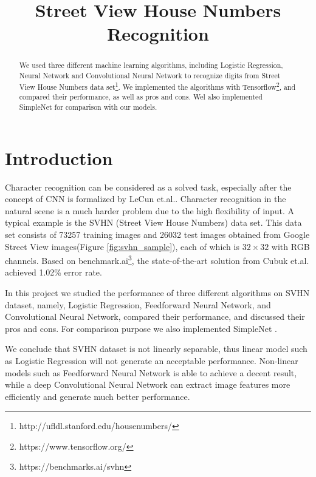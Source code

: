\documentclass[journal]{IEEEtran}
\begin{document}
\title{Street View House Numbers Recognition}
\maketitle

\begin{abstract}
We used three different machine learning algorithms, including Logistic Regression, Neural Network and Convolutional Neural Network to recognize digits from Street View House Numbers data set\footnote{http://ufldl.stanford.edu/housenumbers/}.
We implemented the algorithms with Tensorflow\footnote{https://www.tensorflow.org/}, and compared their performance, as well as pros and cons. Wel also implemented SimpleNet\cite{simplenet} for comparison with our models.
\end{abstract}

\section{Introduction}

Character recognition can be considered as a solved task, especially after the concept of CNN is formalized by LeCun et.al.\cite{lecun1998}. Character recognition in the natural scene is a much harder problem due to the high flexibility 
of input. A typical example is the SVHN (Street View House Numbers) data set. This data set consists of 73257 training images and 26032 test images obtained
from Google Street View images(Figure \ref{fig:svhn_sample}), each of which is $32 \times 32$ with RGB channels. Based on benchmark.ai\footnote{https://benchmarks.ai/svhn}, the state-of-the-art solution from Cubuk et.al.\cite{cubuk2018} achieved 1.02\% error rate.

In this project we studied the performance of three different algorithms on SVHN dataset, namely, Logistic Regression, Feedforward Neural Network, and Convolutional Neural Network, compared their performance, and discussed their pros and cons. For comparison purpose we also implemented SimpleNet \cite{simplenet}.

We conclude that SVHN dataset is not linearly separable, thus linear model such as Logistic Regression will not generate an acceptable performance. Non-linear models such as Feedforward Neural Network is able to achieve a decent result, while a deep Convolutional Neural Network can extract image features more efficiently and generate much better performance.
\end{document}
